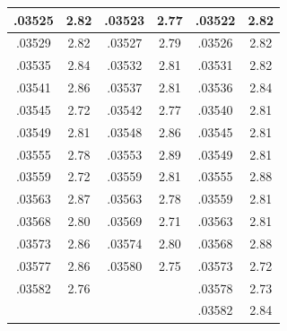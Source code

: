 \documentclass[11pt]{report}
\begin{document}
\begin{appendices}
\begin{longtable}{|c|c||c|c||c|c|}
.03525 & 2.82 & .03523 & 2.77 & .03522 & 2.82\\\hline
.03529 & 2.82 & .03527 & 2.79 & .03526 & 2.82\\\hline
.03535 & 2.84 & .03532 & 2.81 & .03531 & 2.82\\\hline
.03541 & 2.86 & .03537 & 2.81 & .03536 & 2.84\\\hline
.03545 & 2.72 & .03542 & 2.77 & .03540 & 2.81\\\hline
.03549 & 2.81 & .03548 & 2.86 & .03545 & 2.81\\\hline
.03555 & 2.78 & .03553 & 2.89 & .03549 & 2.81\\\hline
.03559 & 2.72 & .03559 & 2.81 & .03555 & 2.88\\\hline
.03563 & 2.87 & .03563 & 2.78 & .03559 & 2.81\\\hline
.03568 & 2.80 & .03569 & 2.71 & .03563 & 2.81\\\hline
.03573 & 2.86 & .03574 & 2.80 & .03568 & 2.88\\\hline
.03577 & 2.86 & .03580 & 2.75 & .03573 & 2.72\\\hline
.03582 & 2.76 &  & & .03578 & 2.73\\\hline
 & &  & & .03582 & 2.84\\\hline
\end{longtable}

\end{appendices}
\end{document}
